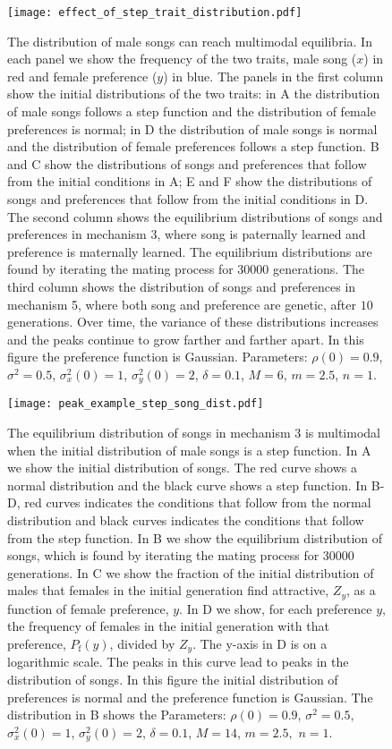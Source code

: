 \documentclass[12pt]{article}
\newcommand{\x}[1]{\text{#1}}
\begin{document}
\begin{figure}
\texttt{[image: effect\_of\_step\_trait\_distribution.pdf]}
\caption{\label{mechs3and5} The distribution of male songs can reach multimodal equilibria. In each panel we show the frequency of the two traits, male song ($x$) in red and female preference ($y$) in blue. The panels in the first column show the initial distributions of the two traits: in A the distribution of male songs follows a step function and the distribution of female preferences is normal; in D the distribution of male songs is normal and the distribution of female preferences follows a step function. B and C show the distributions of songs and preferences that follow from the initial conditions in A; E and F show the distributions of songs and preferences that follow from the initial conditions in D. The second column shows the equilibrium distributions of songs and preferences in mechanism 3, where song is paternally learned and preference is maternally learned. The equilibrium distributions are found by iterating the mating process for $30000$ generations. The third column shows the distribution of songs and preferences in mechanism 5, where both song and preference are genetic, after $10$ generations. Over time, the variance of these distributions increases and the peaks continue to grow farther and farther apart. In this figure the preference function is Gaussian. Parameters: $\rho(0)=0.9$, $\sigma^2=0.5$, $\sigma_x^2(0)=1$, $\sigma_y^2(0)=2$, $\delta=0.1$, $M=6$, $m=2.5$,  $n=1$.}
\end{figure}

\begin{figure}
\texttt{[image: peak\_example\_step\_song\_dist.pdf]}
\caption{\label{peak_example_song}  The equilibrium distribution of songs in mechanism 3 is multimodal when the initial distribution of male songs is a step function. In A we show the initial distribution of songs. The red curve shows a normal distribution and the black curve shows a step function. In B-D, red curves indicates the conditions that follow from the normal distribution and black curves indicates the conditions that follow from the step function. In B we show the equilibrium distribution of songs, which is found by iterating the mating process for $30000$ generations. In C we show the fraction of the initial distribution of males that females in the initial generation find attractive, $Z_y$, as a function of female preference, $y$. In D we show, for each preference $y$, the frequency of females in the initial generation with that preference, $P_\x{f}(y)$, divided by $Z_y$. The y-axis in D is on a logarithmic scale. The peaks in this curve lead to peaks in the distribution of songs.  In this figure the initial distribution of preferences is normal and the preference function is Gaussian. The distribution in B shows the Parameters: $\rho(0)=0.9$, $\sigma^2=0.5$,  $\sigma_x^2(0)=1$, $\sigma_y^2(0)=2$,  $\delta=0.1$, $M=14$, $m=2.5,$ $n=1$. 
}
\end{figure}
\end{document}
